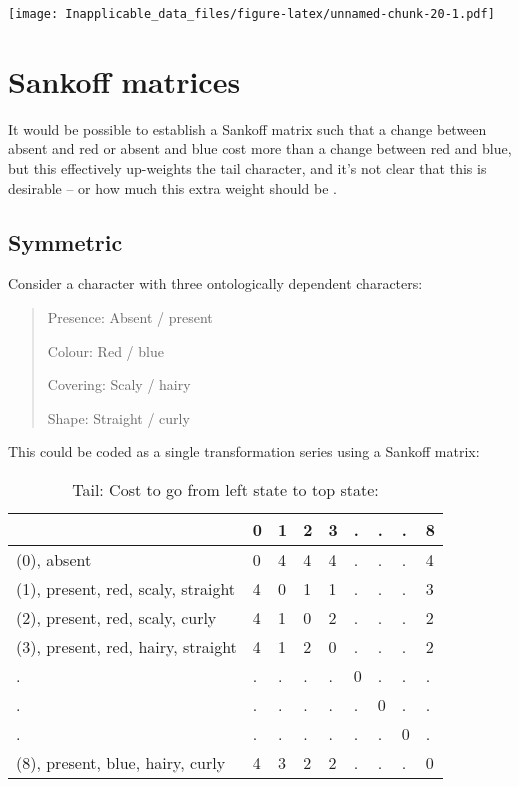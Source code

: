 \documentclass[]{book}
\theoremstyle{definition}
\theoremstyle{definition}
\theoremstyle{definition}
\theoremstyle{remark}
\begin{document}
\texttt{[image: Inapplicable\_data\_files/figure-latex/unnamed-chunk-20-1.pdf]}

\hypertarget{sankoff-matrices}{%
\section{Sankoff matrices}\label{sankoff-matrices}}

It would be possible to establish a Sankoff matrix such that a change
between absent and red or absent and blue cost more than a change
between red and blue, but this effectively up-weights the tail
character, and it's not clear that this is desirable -- or how much this
extra weight should be \citep{Maddison1993}.

\hypertarget{symmetric}{%
\subsection{Symmetric}\label{symmetric}}

Consider a character with three ontologically dependent characters:

\begin{quote}
Presence: Absent / present

Colour: Red / blue

Covering: Scaly / hairy

Shape: Straight / curly
\end{quote}

This could be coded as a single transformation series using a Sankoff
matrix:

\begin{table}

\caption{\label{tab:unnamed-chunk-21}Tail: Cost to go from left state to top state:}
\centering
\begin{tabular}[t]{l|l|l|l|l|l|l|l|l}
\hline
  & 0 & 1 & 2 & 3 & . & . & . & 8\\
\hline
(0), absent & 0 & 4 & 4 & 4 & . & . & . & 4\\
\hline
(1), present, red, scaly, straight & 4 & 0 & 1 & 1 & . & . & . & 3\\
\hline
(2), present, red, scaly, curly & 4 & 1 & 0 & 2 & . & . & . & 2\\
\hline
(3), present, red, hairy, straight & 4 & 1 & 2 & 0 & . & . & . & 2\\
\hline
. & . & . & . & . & 0 & . & . & .\\
\hline
. & . & . & . & . & . & 0 & . & .\\
\hline
. & . & . & . & . & . & . & 0 & .\\
\hline
(8), present, blue, hairy, curly & 4 & 3 & 2 & 2 & . & . & . & 0\\
\hline
\end{tabular}
\end{table}
\end{document}
